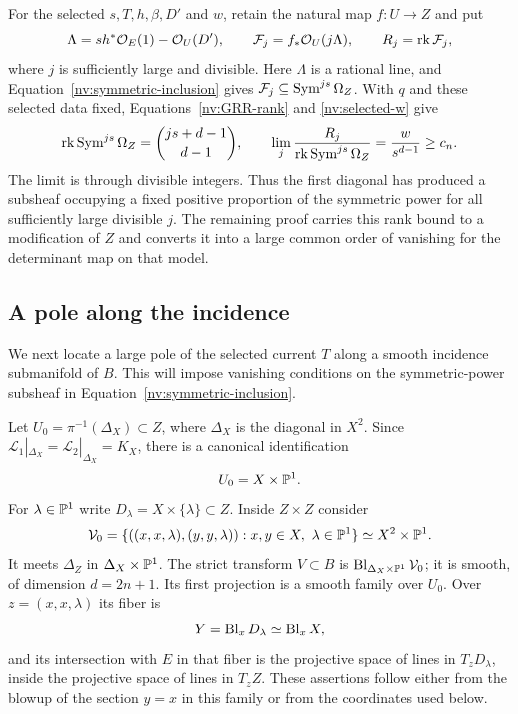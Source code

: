 For the selected \(s,T,h,\beta,D'\) and \(w\), retain the natural map
\(f:U\to Z\) and put
\[
 \Lambda=s h^*\mathcal O_E(1)-\mathcal O_U(D'),\qquad
 \mathcal F_j=f_*\mathcal O_U(j\Lambda),\qquad R_j=\operatorname{rk}\mathcal F_j,
\]
where \(j\) is sufficiently large and divisible.  Here \(\Lambda\) is a
rational line, and Equation~\eqref{nv:symmetric-inclusion} gives
\(\mathcal F_j\subseteq\operatorname{Sym}^{js}\Omega_Z\).  With \(q\) and these selected
data fixed, Equations~\eqref{nv:GRR-rank} and \eqref{nv:selected-w} give
\begin{equation}\label{nv:selected-rank-fraction}
 \operatorname{rk}\operatorname{Sym}^{js}\Omega_Z=\binom{js+d-1}{d-1},\qquad
 \lim_j\frac{R_j}{\operatorname{rk}\operatorname{Sym}^{js}\Omega_Z}
       =\frac{w}{s^{d-1}}\ge c_n .
\end{equation}
The limit is through divisible integers.  Thus the first diagonal has
produced a subsheaf occupying a fixed positive proportion of the symmetric
power for all sufficiently large divisible \(j\).  The remaining proof
carries this rank bound to a modification of \(Z\) and converts it into a
large common order of vanishing for the determinant map on that model.

\subsection{A pole along the incidence}

We next locate a large pole of the selected current \(T\) along a smooth
incidence submanifold of \(B\).  This will impose vanishing conditions on the
symmetric-power subsheaf in Equation~\eqref{nv:symmetric-inclusion}.

Let \(U_0=\pi^{-1}(\Delta_X)\subset Z\), where \(\Delta_X\) is the
diagonal in \(X^2\).  Since
\(\mathscr L_1|_{\Delta_X}=\mathscr L_2|_{\Delta_X}=K_X\), there is a
canonical identification
\[
 U_0=X\times\mathbb P^1.
\]
For \(\lambda\in\mathbb P^1\) write \(D_\lambda=X\times\{\lambda\}\subset Z\).
Inside \(Z\times Z\) consider
\[
 \mathcal V_0
  =\{((x,x,\lambda),(y,y,\lambda)):x,y\in X,\ \lambda\in\mathbb P^1\}
  \simeq X^2\times\mathbb P^1.
\]
It meets \(\Delta_Z\) in \(\Delta_X\times\mathbb P^1\).  The strict transform
\(V\subset B\) is
\(\operatorname{Bl}_{\Delta_X\times\mathbb P^1}\mathcal V_0\); it is smooth, of dimension
\(d=2n+1\).  Its first projection is a smooth family over \(U_0\).
Over \(z=(x,x,\lambda)\) its fiber is
\[
 Y=\operatorname{Bl}_xD_\lambda\simeq\operatorname{Bl}_xX,
\]
and its intersection with \(E\) in that fiber is the projective space
of lines in \(T_zD_\lambda\), inside the projective space of lines in
\(T_zZ\).  These assertions follow either from the blowup of the
section \(y=x\) in this family or from the coordinates used below.

